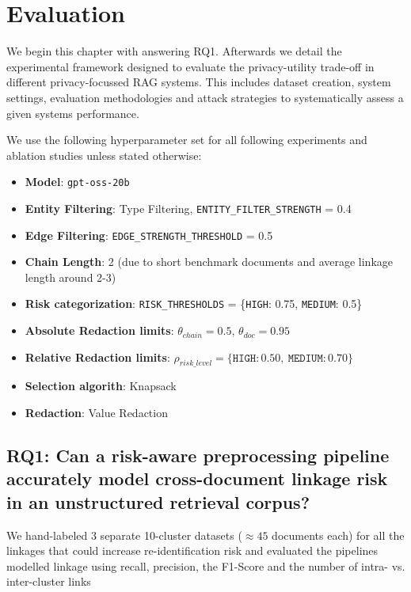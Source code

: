 \chapter{Evaluation}\label{chapter:evaluation}
We begin this chapter with answering RQ1. Afterwards we detail the experimental framework designed to evaluate the privacy-utility trade-off in different privacy-focussed \ac{RAG} systems. This includes dataset creation, system settings, evaluation methodologies and attack strategies to systematically assess a given systems performance.

We use the following hyperparameter set for all following experiments and ablation studies unless stated otherwise:
\begin{tcolorbox}[title={sAnon Configuration}, label={evaluation-subsec:sanon-config}]
  \small
  \begin{itemize}
    \item \textbf{Model}: \texttt{gpt-oss-20b}
    \item \textbf{Entity Filtering}: Type Filtering, \texttt{ENTITY\_FILTER\_STRENGTH} = 0.4
    \item \textbf{Edge Filtering}: \texttt{EDGE\_STRENGTH\_THRESHOLD} = 0.5
    \item \textbf{Chain Length}: 2 (due to short benchmark documents and average linkage length around 2-3)
    \item \textbf{Risk categorization}: \texttt{RISK\_THRESHOLDS} = \{\texttt{HIGH}: 0.75, \texttt{MEDIUM}: 0.5\}
    \item \textbf{Absolute Redaction limits}: $\theta_{chain} = 0.5$, $\theta_{doc} = 0.95$ 
    \item \textbf{Relative Redaction limits}: $\rho_{risk\_level} = \{\texttt{HIGH}:0.50,\ \texttt{MEDIUM}:0.70\}$
    \item \textbf{Selection algorith}: Knapsack
    \item \textbf{Redaction}: Value Redaction
\end{itemize}
\end{tcolorbox}




\section{RQ1: Can a risk-aware preprocessing pipeline accurately model cross-document linkage risk in an unstructured retrieval corpus?} %
We hand-labeled 3 separate 10-cluster datasets ($\approx 45$ documents each) for all the linkages that could increase re-identification risk and evaluated the pipelines modelled linkage using recall, precision, the F1-Score and the number of intra- vs. inter-cluster links

